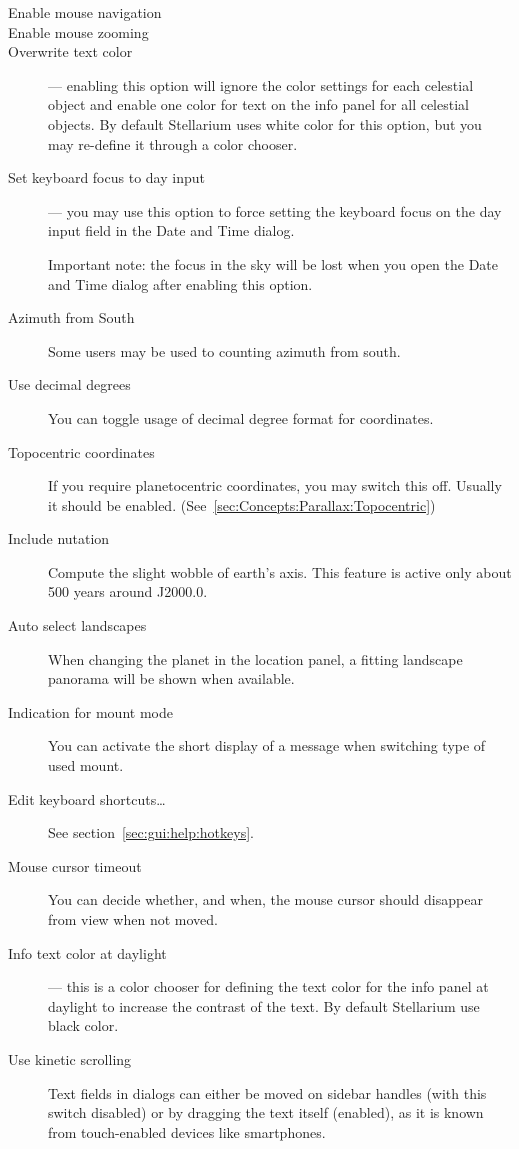 \begin{description}
\item[Enable mouse navigation]
\item[Enable mouse zooming]
\item[Overwrite text color] --- enabling this option will ignore the 
  color settings for each celestial object and enable one color for text on the info panel 
  for all celestial objects. By default Stellarium uses white color for this option, 
  but you may re-define it through a color chooser.
\item[Set keyboard focus to day input] --- you may use this option to force setting the 
  keyboard focus on the day input field in the Date and Time dialog. 
  
  Important note: the focus in the sky will be lost when you open the 
  Date and Time dialog after enabling this option.
\item[Azimuth from South] Some users may be used to counting azimuth
  from south.
\item[Use decimal degrees] You can toggle usage of decimal degree format for coordinates.
\item[Topocentric coordinates] If you require planetocentric coordinates, you may switch this off. 
  Usually it should be enabled. (See~\ref{sec:Concepts:Parallax:Topocentric})
\item[Include nutation] Compute the slight wobble of earth's
  axis. This feature is active only about 500 years around J2000.0.
\item[Auto select landscapes] When changing the planet in the location
  panel, a fitting landscape panorama will be shown when available.
\item[Indication for mount mode] You can activate the short display of a message when switching type of used mount.
\item[Edit keyboard shortcuts\ldots] See section~\ref{sec:gui:help:hotkeys}.
\item[Mouse cursor timeout] You can decide whether, and when, the
  mouse cursor should disappear from view when not moved.
\item[Info text color at daylight] --- this is a color chooser for defining the 
  text color for the info panel at daylight to increase the contrast of the text. 
  By default Stellarium use black color.
\item[Use kinetic scrolling]  Text fields in  
dialogs can either be moved on sidebar handles (with this switch
disabled) or by dragging the text itself (enabled), as it is known
from touch-enabled devices like smartphones. 
\end{description}

